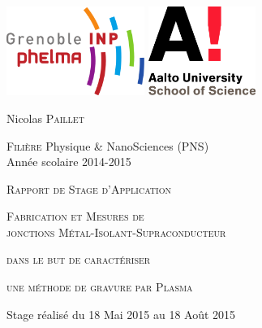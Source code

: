 \documentclass[a4paper,11pt]{article}
\begin{document}

    \begin{center}
    
        \includegraphics[width=45mm]{logo_phelma.png}
        \hfill
        \includegraphics[width=35mm]{logo_aalto.png}
        \vspace{2cm}
        
        {\LARGE Nicolas \textsc{Paillet}}\\
        \vspace{0.5cm}
        
        \textsc{Filière} Physique \& NanoSciences (PNS)\\
        Année scolaire 2014-2015\\
        \vspace{1.5cm}
        
        {\LARGE \textsc{Rapport de Stage d'Application}}
        \vspace{0.4cm}
        
        {\Huge \textsc{Fabrication et Mesures de}\\        
        \textsc{jonctions Métal-Isolant-Supraconducteur}
        \vspace{0.3cm}
        
        \textsc{dans le but de caractériser}
                      
        \textsc{une méthode de gravure par Plasma}}
        
        \vspace{2cm}
        
        Stage réalisé du 18 Mai 2015 au 18 Août 2015\\
        

\end{center}
\end{document}
